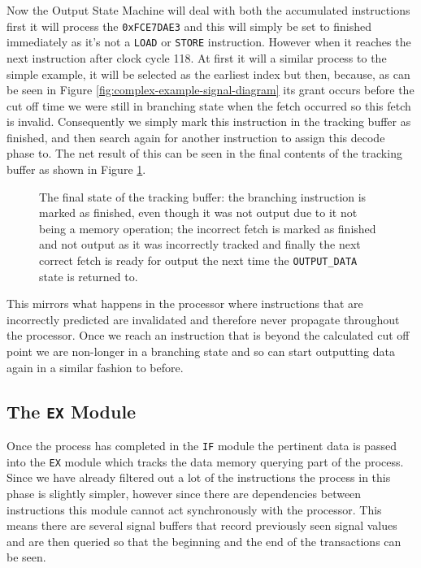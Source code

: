 Now the Output State Machine will deal with both the accumulated instructions first it will process the \texttt{0xFCE7DAE3} and this will simply be set to finished immediately as it's not a \texttt{LOAD} or \texttt{STORE} instruction. However when it reaches the next instruction after clock cycle 118. At first it will a similar process to the simple example, it will be selected as the earliest index but then, because, as can be seen in Figure \ref{fig:complex-example-signal-diagram} its grant occurs before the cut off time we were still in branching state when the fetch occurred so this fetch is invalid. Consequently we simply mark this instruction in the tracking buffer as finished, and then search again for another instruction to assign this decode phase to. The net result of this can be seen in the final contents of the tracking buffer as shown in Figure \ref{fig:complex-example-step-4}.

\begin{figure}[htbp]
	
	\caption{The final state of the tracking buffer: the branching instruction is marked as finished, even though it was not output due to it not being a memory operation; the incorrect fetch is marked as finished and not output as it was incorrectly tracked and finally the next correct fetch is ready for output the next time the \texttt{OUTPUT\_DATA} state is returned to.}
	\label{fig:complex-example-step-4}
\end{figure} 

This mirrors what happens in the processor where instructions that are incorrectly predicted are invalidated and therefore never propagate throughout the processor. Once we reach an instruction that is beyond the calculated cut off point we are non-longer in a branching state and so can start outputting data again in a similar fashion to before.

\subsection{The \texttt{EX} Module}

Once the process has completed in the \texttt{IF} module the pertinent data is passed into the \texttt{EX} module which tracks the data memory querying part of the process. Since we have already filtered out a lot of the instructions the process in this phase is slightly simpler, however since there are dependencies between instructions this module cannot act synchronously with the processor. This means there are several signal buffers that record previously seen signal values and are then queried so that the beginning and the end of the transactions can be seen. 

